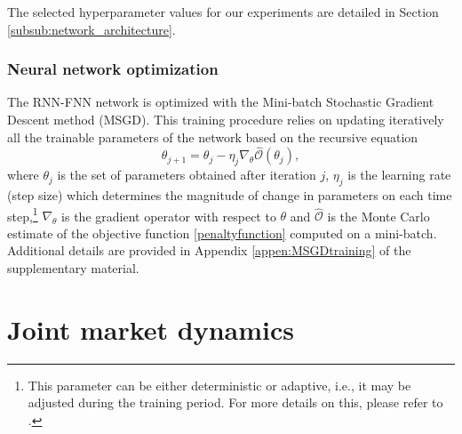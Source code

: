 \documentclass[12pt]{article}
\begin{document}
The selected hyperparameter values for our experiments are detailed in Section \ref{subsub:network_architecture}.



\subsubsection{Neural network optimization}\label{subse:neural optimization}

The RNN-FNN network is optimized with the Mini-batch Stochastic Gradient Descent method (MSGD). This training procedure relies on updating iteratively all the trainable parameters of the network  based on the recursive equation
\begin{equation}\label{updatingrule}
    \theta_{j+1} = \theta_{j}-\eta_{j}\nabla_{\theta} \hat{\mathcal{O}}(\theta_{j}),
\end{equation}
where $\theta_{j}$ is the set of parameters obtained after iteration $j$, $\eta_{j}$ is the learning rate (step size) which determines the magnitude of change in parameters on each time step,\footnote{This parameter can be either deterministic or adaptive, i.e., it may be adjusted during the training period. For more details on this, please refer to \cite{goodfellow2016deep}.} 
$\nabla_{\theta}$ is the gradient operator with respect to $\theta$ and $\hat{\mathcal{O}}$ is the Monte Carlo estimate of the objective function \eqref{penaltyfunction} computed on a mini-batch. Additional details are provided in Appendix \ref{appen:MSGDtraining} of the supplementary material. 


\section{Joint market dynamics}\label{se:JMD}
\end{document}
